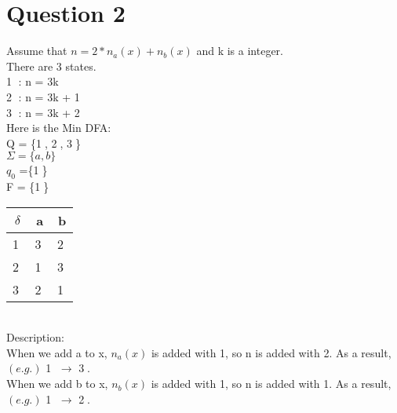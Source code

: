 \documentclass[a4paper]{article}
\begin{document}
\section{Question 2}
Assume that $n = 2 * n_{a}(x) + n_{b}(x)$ and k is a integer.\\
There are 3 states.\\
\textcircled{1} : n = 3k \\
\textcircled{2} : n = 3k + 1 \\
\textcircled{3} : n = 3k + 2  \\
Here is the Min DFA:\\
Q = \{\textcircled{1}, \textcircled{2}, \textcircled{3}\}\\
$\Sigma = \{a, b\}$\\
$q_{0}$ =\{\textcircled{1}\}\\
F = \{\textcircled{1}\}\\
\begin{tabular}{|c|c|c|}
\hline
$\delta$ & a & b \\ 
\hline
\textcircled{1} & \textcircled{3} & \textcircled{2} \\
\hline
\textcircled{2} & \textcircled{1} & \textcircled{3} \\
\hline
\textcircled{3} & \textcircled{2} & \textcircled{1} \\
\hline
\end{tabular}\\
Description:\\
When we add a to x, $n_{a}(x)$ is added with 1, so n is added with 2. As a result,$(e.g.)$ \textcircled{1} $\rightarrow$ \textcircled{3}.\\
When we add b to x, $n_{b}(x)$ is added with 1, so n is added with 1. As a result,$(e.g.)$ \textcircled{1} $\rightarrow$ \textcircled{2}.\\

\end{document}
